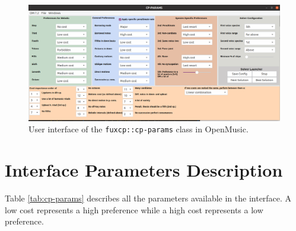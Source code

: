 \begin{figure}[h]
    \includegraphics[width=1.2\textwidth, center]{Images/om_int_interface.png}
    \caption{User interface of the \texttt{fuxcp::cp-params} class in OpenMusic.}
    \label{fig:om_int_interface}
\end{figure}

\section{Interface Parameters Description} \label{appendix:interface-parameters-description}
Table \ref{tab:cp-params} describes all the parameters available in the interface. A low cost represents a high preference while a high cost represents a low preference.

